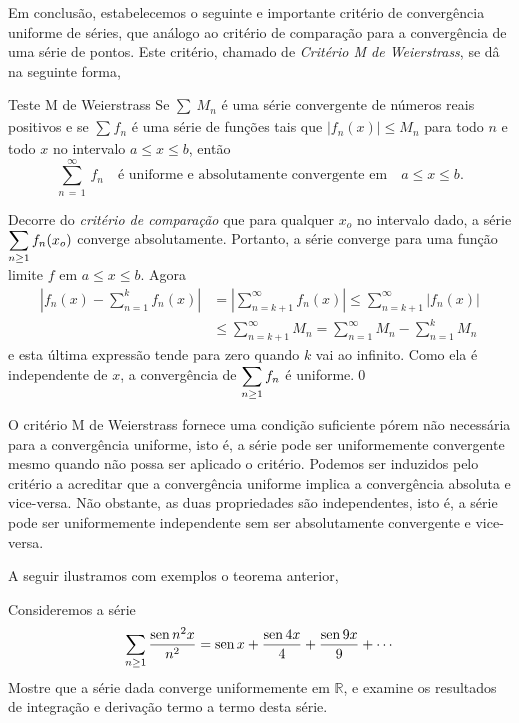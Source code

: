 Em conclusão, estabelecemos o seguinte e importante critério de
convergência uniforme de séries, que análogo ao critério de
comparação para a convergência de uma série de pontos. Este
critério, chamado de \textit{Critério  M de Weierstrass}, se dâ na
seguinte forma,
\begin{theoc}{Teste M de Weierstrass}{} 
Se $\sum_{}\, M_{n}$ é
uma série convergente de números reais positivos e se
$\sum_{}f_{n}$  é uma série de funções tais que
$|f_{n}(x)|\leq M_n$ para todo $n$ e todo $x$ no intervalo $a \leq x
\leq b$, então 
\begin{equation*}
\sum_{n\,=\, 1}^{\infty}\,f_{n}\quad  \text{é uniforme e absolutamente convergente em}\quad  a \leq x \leq b.
\end{equation*}
\end{theoc}

\prova Decorre do \textit{critério de comparação} que para
qualquer $x_o$ no intervalo dado, a série $\displaystyle{\sum_{n\geq
1}f_n(x_o)}$ converge absolutamente. Portanto, a série converge
para uma função limite $f$ em $a \leq x \leq  b$. Agora
\begin{align*}
\left|f_n(x)
-\sum_{n=1}^{k}f_n(x)\right|&=\left|\sum_{n=k+1}^{\infty}f_n(x)\right|
\leq\sum_{n=k+1}^{\infty}|f_n(x)|\\[2ex]
 &\leq \sum_{n=k+1}^{\infty}M_n= \sum_{n=1}^{\infty}M_n-\sum_{n=1}^{k}M_n
\end{align*}
e esta última expressão tende para zero quando $k$ vai ao
infinito. Como ela é independente de $x$, a convergência de
$\displaystyle{\sum_{n\geq 1}f_n}$ é uniforme.\qed

\begin{obs}
O critério M de Weierstrass fornece uma condição suficiente pórem
não necessária para a convergência uniforme, isto é, a série pode
ser uniformemente convergente mesmo quando não possa ser aplicado
o critério. Podemos ser induzidos pelo critério a acreditar que a
convergência uniforme implica a convergência absoluta e
vice-versa. Não obstante, as duas propriedades são independentes,
isto é, a série pode ser uniformemente independente sem ser
absolutamente convergente e vice-versa.
\end{obs}

A seguir ilustramos com exemplos o teorema anterior,

\begin{exer} Consideremos a série
\begin{equation}\label{conuni-5}
\sum_{n\geq 1}\frac{\operatorname{sen} n^2 x}{n^2} = \operatorname{sen} x + \frac{\operatorname{sen} 4x}{4}
+ \frac{\operatorname{sen} 9x}{9}+\cdots
\end{equation}
Mostre que a série dada converge uniformemente em $\mathbb{R}$, e
examine os resultados de integração e derivação termo a termo
desta série.
\end{exer}


